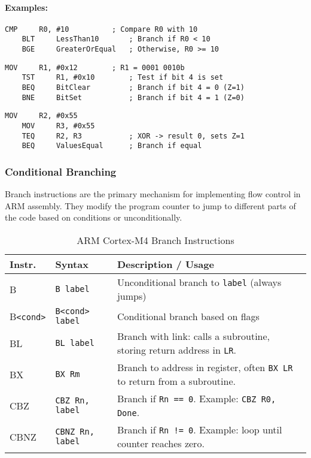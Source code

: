 \noindent\paragraph{Examples:}
\hfill
\begin{lstlisting}[caption={Arithmetic comparison using CMP}]
    CMP     R0, #10          ; Compare R0 with 10
    BLT     LessThan10       ; Branch if R0 < 10
    BGE     GreaterOrEqual   ; Otherwise, R0 >= 10
\end{lstlisting}

\begin{lstlisting}[caption={Bit test using TST}]
    MOV     R1, #0x12        ; R1 = 0001 0010b
    TST     R1, #0x10        ; Test if bit 4 is set
    BEQ     BitClear         ; Branch if bit 4 = 0 (Z=1)
    BNE     BitSet           ; Branch if bit 4 = 1 (Z=0)
\end{lstlisting}

\begin{lstlisting}[caption={Equality check using TEQ}]
    MOV     R2, #0x55
    MOV     R3, #0x55
    TEQ     R2, R3           ; XOR -> result 0, sets Z=1
    BEQ     ValuesEqual      ; Branch if equal
\end{lstlisting}

\subsubsection{Conditional Branching}
Branch instructions are the primary mechanism for implementing flow control in ARM assembly. They modify the program counter to jump to different parts of the code based on conditions or unconditionally.

\begin{table}[H]
\centering
\caption{ARM Cortex-M4 Branch Instructions}
\small
\begin{tabularx}{\linewidth}{@{}l l X@{}}
\toprule
\textbf{Instr.} & \textbf{Syntax} & \textbf{Description / Usage} \\
\midrule
B       & \texttt{B label}        & Unconditional branch to \texttt{label} (always jumps) \\
B\texttt{<cond>} & \texttt{B<cond> label}  & Conditional branch based on flags \\
BL      & \texttt{BL label}       & Branch with link: calls a subroutine, storing return address in \texttt{LR}. \\
BX      & \texttt{BX Rm}          & Branch to address in register, often \texttt{BX LR} to return from a subroutine. \\
CBZ     & \texttt{CBZ Rn, label}  & Branch if \texttt{Rn == 0}. Example: \texttt{CBZ R0, Done}. \\
CBNZ    & \texttt{CBNZ Rn, label} & Branch if \texttt{Rn != 0}. Example: loop until counter reaches zero. \\
\bottomrule
\end{tabularx}
\end{table}

